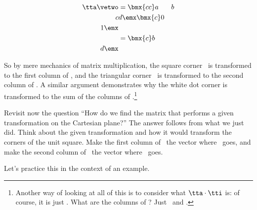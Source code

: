 \begin{align*}
\tta\vetwo &= \bmx{cc}a&b\\c&d\emx\bmx{c}0\\1\emx \\
					&= \bmx{c}b\\d\emx
\end{align*}

So by mere mechanics of matrix multiplication, the square corner \veone\ is transformed to the first column of \tta, and the triangular corner \vetwo\ is transformed to the second column of \tta. A similar argument demonstrates why the white dot corner is transformed to the sum of the columns of \tta.\footnote{Another way of looking at all of this is to consider what $\tta\cdot\tti$ is: of course, it is just \tta. What are the columns of \tti? Just \veone\ and \vetwo.}

Revisit now the question ``How do we find the matrix that performs a given transformation on the Cartesian plane?'' The answer follows from what we just did. Think about the given transformation and how it would transform the corners of the unit square. Make the first column of \tta\ the vector where \veone\ goes, and make the second column of \tta\ the vector where \vetwo\ goes.

Let's practice this in the context of an example.

\medskip

